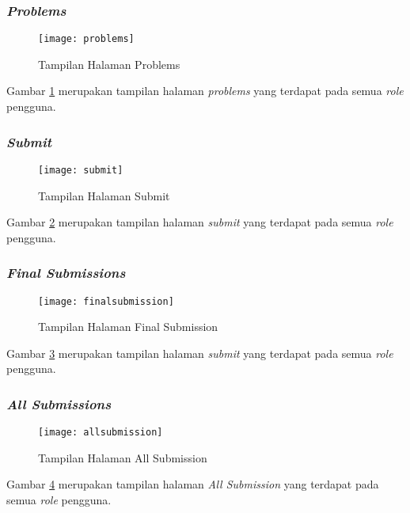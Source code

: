 \subsubsection{\textit{Problems}}
\begin{figure}[H]
	\centering  
	\texttt{[image: problems]}  
	\caption[Tampilan Halaman \textit{Problems}]{Tampilan Halaman Problems} 
	\label{fig:problems} 
\end{figure}

Gambar \ref{fig:problems} merupakan tampilan halaman \textit{problems} yang terdapat pada semua \textit{role} pengguna.

\subsubsection{\textit{Submit}}
\begin{figure}[H]
	\centering  
	\texttt{[image: submit]}  
	\caption[Tampilan Halaman \textit{Submit}]{Tampilan Halaman Submit} 
	\label{fig:submit} 
\end{figure}

Gambar \ref{fig:submit} merupakan tampilan halaman \textit{submit} yang terdapat pada semua \textit{role} pengguna.

\subsubsection{\textit{Final Submissions}}
\begin{figure}[H]
	\centering  
	\texttt{[image: finalsubmission]}  
	\caption[Tampilan Halaman \textit{Final Submission}]{Tampilan Halaman Final Submission} 
	\label{fig:finalsubmission} 
\end{figure}

Gambar \ref{fig:finalsubmission} merupakan tampilan halaman \textit{submit} yang terdapat pada semua \textit{role} pengguna.
\subsubsection{\textit{All Submissions}}
\begin{figure}[H]
	\centering  
	\texttt{[image: allsubmission]}  
	\caption[Tampilan Halaman \textit{All Submission}]{Tampilan Halaman All Submission} 
	\label{fig:allsubmission} 
\end{figure}

Gambar \ref{fig:allsubmission} merupakan tampilan halaman \textit{All Submission} yang terdapat pada semua \textit{role} pengguna.


